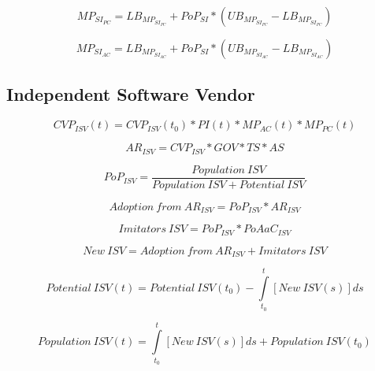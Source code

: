 \begin{equation}
	MP_{SI_{PC}} = LB_{MP_{SI_{PC}}} + PoP_{SI} * (UB_{MP_{SI_{PC}}} - LB_{MP_{SI_{PC}}})
\end{equation}

\begin{equation}
	MP_{SI_{AC}} = LB_{MP_{SI_{AC}}} + PoP_{SI} * (UB_{MP_{SI_{AC}}} - LB_{MP_{SI_{AC}}})
\end{equation}

\subsection{Independent Software Vendor}\label{ch:app04:csf:isv}

\begin{equation}
		CVP_{ISV}(t) =  CVP_{ISV}(t_0) * PI(t) * MP_{AC}(t) * MP_{PC}(t)
\end{equation}

\begin{equation}
		AR_{ISV} = CVP_{ISV} * GOV * TS * AS		
\end{equation}

\begin{equation}
	PoP_{ISV} = \frac{\mathit{Population~ISV}}{\mathit{Population~ISV}+\mathit{Potential~ISV}}
\end{equation}

\begin{equation}
	\mathit{Adoption~from~AR_{ISV}} = PoP_{ISV} * AR_{ISV}
\end{equation}

\begin{equation}
	\mathit{Imitators~ISV} = PoP_{ISV} * PoAaC_{ISV}
\end{equation}

\begin{equation}
	\mathit{New~ISV} = \mathit{Adoption~from~AR_{ISV}} + \mathit{Imitators~ISV}
\end{equation}

\begin{equation}
	\mathit{Potential~ISV(t)} =\mathit{Potential~ISV(t_0)} - \int\limits_{t_0}^t  [\mathit{New~ISV}(s)]ds
\end{equation}

\begin{equation}
	\mathit{Population~ISV(t)} = \int\limits_{t_0}^t [\mathit{New~ISV}(s)]ds + \mathit{Population~ISV(t_0)}
\end{equation}

